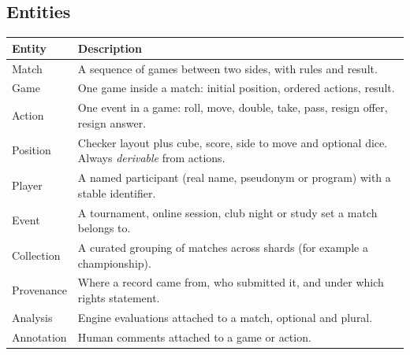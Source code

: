 \documentclass[11pt,a4paper]{article}
\begin{document}
\subsection{Entities}
\begin{longtable}{@{}p{2.6cm}p{11.7cm}@{}}
\toprule
\textbf{Entity} & \textbf{Description}\\
\midrule
\endhead
Match & A sequence of games between two sides, with rules and result.\\
Game & One game inside a match: initial position, ordered actions, result.\\
Action & One event in a game: roll, move, double, take, pass, resign offer, resign answer.\\
Position & Checker layout plus cube, score, side to move and optional dice. Always \emph{derivable} from actions.\\
Player & A named participant (real name, pseudonym or program) with a stable identifier.\\
Event & A tournament, online session, club night or study set a match belongs to.\\
Collection & A curated grouping of matches across shards (for example a championship).\\
Provenance & Where a record came from, who submitted it, and under which rights statement.\\
Analysis & Engine evaluations attached to a match, optional and plural.\\
Annotation & Human comments attached to a game or action.\\
\bottomrule
\end{longtable}
\end{document}
